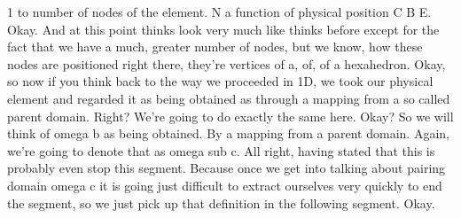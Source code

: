 \documentclass[10pt]{article}
\begin{document}
1 to number of nodes of the element. N a function of physical position C B E. Okay. And at this point thinks look very much like thinks before except for the fact that we have a much, greater number of nodes, but we know, how these nodes are positioned right there, they're vertices of a, of, of a hexahedron. Okay, so now if you think back to the way we proceeded in 1D, we took our physical element and regarded it as being obtained as through a mapping from a so called parent domain. Right? We're going to do exactly the same here. Okay? So we will think of omega b as being obtained. By a mapping from a parent domain. Again, we're going to denote that as omega sub c. All right, having stated that this is probably even stop this segment. Because once we get into talking about pairing domain omega c it is going just difficult to extract ourselves very quickly to end the segment, so we just pick up that definition in the following segment. Okay.
\end{document}
